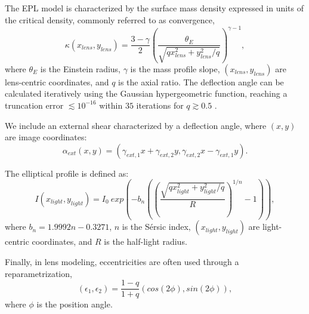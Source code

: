 The EPL model is characterized by the surface mass density expressed in units of the critical density, commonly referred to as convergence,
\begin{equation}
    \kappa(x_{lens}, y_{lens}) = \frac{3-\gamma}{2}\left(\frac{\theta_E}{\sqrt{q x_{lens}^2+y_{lens}^2 / q}}\right)^{\gamma-1},
\end{equation}
where $\theta_E$ is the Einstein radius, $\gamma$ is the mass profile slope, $(x_{lens}, y_{lens})$ are lens-centric coordinates, and $q$ is the axial ratio. 
The deflection angle can be calculated iteratively using the Gaussian hypergeometric function, reaching a truncation error $\lesssim 10^{-16}$ within $35$ iterations for $q\gtrsim 0.5$ \citep{tessore2015a}.




We include an external shear characterized by a deflection angle, where $(x,y)$ are image coordinates:
\begin{equation}
    \alpha_{ext}(x,y)=\left(\gamma_{ext, 1}x+\gamma_{ext, 2}y, \gamma_{ext, 2}x-\gamma_{ext, 1}y\right).
\end{equation}




The elliptical \ser profile is defined as:
\begin{equation}
I(x_{light}, y_{light})= I_0 \ exp\left(-b_n\left(\left(\frac{\sqrt{q x_{light}^2+y_{light}^2 / q}}{R}\right)^{1/n} - 1
\right)
\right),
\end{equation}
where $b_n = 1.9992 n - 0.3271$, $n$ is the Sérsic index, $(x_{light}, y_{light})$ are light-centric coordinates, and $R$ is the half-light radius. 

Finally, in lens modeling, eccentricities are often used through a reparametrization,
\begin{equation}
    (\epsilon_1, \epsilon_2) = \frac{1-q}{1+q}\left(cos(2\phi), sin(2\phi)\right),
\end{equation}
where $\phi$ is the position angle. 